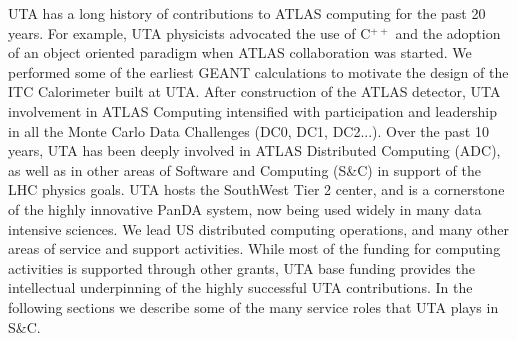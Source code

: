
UTA has a long history of contributions to ATLAS computing for the past 20 years. For example, UTA physicists advocated the use of C$^{++}$ and the adoption of an object oriented paradigm when ATLAS collaboration was started. We performed some of the earliest GEANT calculations to motivate the design of the ITC Calorimeter built at UTA. After construction of the ATLAS detector, UTA involvement in ATLAS Computing intensified with participation and leadership in all the Monte Carlo Data Challenges (DC0, DC1, DC2...). Over the past 10 years, UTA has been deeply involved in ATLAS Distributed Computing (ADC), as well as in other areas of Software and Computing (S\&C) in support of the LHC physics goals. UTA hosts the SouthWest Tier 2 center, and is a cornerstone of the highly innovative PanDA system, now being used widely in many data intensive sciences. We lead US distributed computing operations, and many other areas of service and support activities. While most of the funding for computing activities is supported through other grants, UTA base funding provides the intellectual underpinning of the highly successful UTA contributions. In the following sections we describe some of the many service roles that UTA plays in S\&C.


